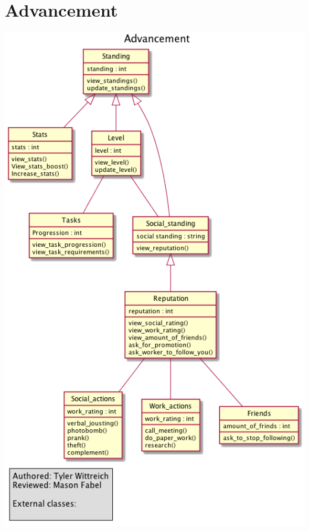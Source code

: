 \documentclass[12pt]{article}
\begin{document}
\section{Advancement}
\includegraphics[height=\textheight]{advancement.png}
\end{document}
